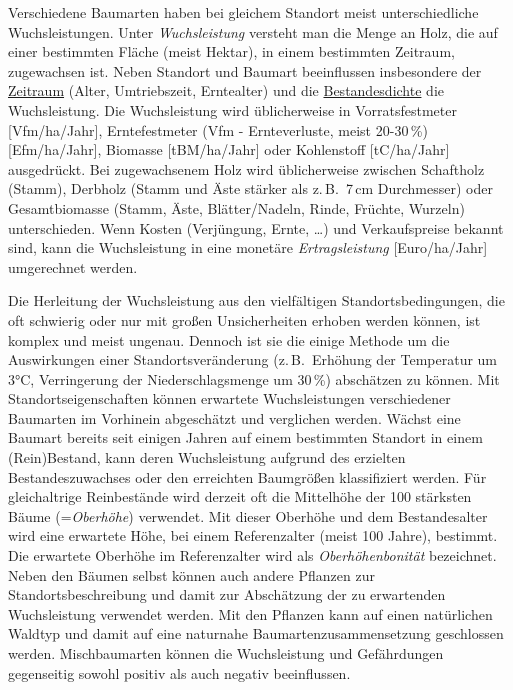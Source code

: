 \documentclass[twocolumn]{scrartcl}
\begin{document}
Verschiedene Baumarten haben bei gleichem Standort meist unterschiedliche
Wuchsleistungen. Unter \emph{Wuchsleistung} versteht man
die Menge an Holz, die auf einer bestimmten Fläche (meist Hektar), in einem
bestimmten Zeitraum, zugewachsen ist. Neben Standort und Baumart beeinflussen
insbesondere der \hyperref[sec:AlterUndErntezeitpunkt]{Zeitraum} (Alter,
Umtriebszeit, Erntealter) und die
\hyperref[sec:StammzahlUndBestandesdichte]{Bestandesdichte} die Wuchsleistung.
Die Wuchsleistung wird üblicherweise in Vorratsfestmeter [Vfm/ha/Jahr],
Erntefestmeter (Vfm - Ernteverluste, meist 20-30\,\%) [Efm/ha/Jahr], Biomasse
[tBM/ha/Jahr] oder Kohlenstoff [tC/ha/Jahr] ausgedrückt. Bei zugewachsenem Holz
wird üblicherweise zwischen Schaftholz (Stamm), Derbholz (Stamm und Äste stärker
als z.\,B.\ 7\,cm Durchmesser) oder Gesamtbiomasse (Stamm, Äste, Blätter/Nadeln,
Rinde, Früchte, Wurzeln) unterschieden. Wenn Kosten (Verjüngung, Ernte, \dots)
und Verkaufspreise bekannt sind, kann die Wuchsleistung in eine monetäre
\emph{Ertragsleistung} [Euro/ha/Jahr] umgerechnet werden.

Die Herleitung der Wuchsleistung aus den vielfältigen Standortsbedingungen, die
oft schwierig oder nur mit großen Unsicherheiten erhoben werden können, ist
komplex und meist ungenau. Dennoch ist sie die einige Methode um die
Auswirkungen einer Standortsveränderung (z.\,B.\ Erhöhung der Temperatur um 3°C,
Verringerung der Niederschlagsmenge um 30\,\%) abschätzen zu können. Mit
Standortseigenschaften können erwartete Wuchsleistungen verschiedener Baumarten
im Vorhinein abgeschätzt und verglichen werden. Wächst eine Baumart bereits seit
einigen Jahren auf einem bestimmten Standort in einem (Rein)Bestand, kann deren
Wuchsleistung aufgrund des erzielten Bestandeszuwachses oder den erreichten
Baumgrößen klassifiziert werden. Für gleichaltrige Reinbestände wird derzeit oft
die Mittelhöhe der 100 stärksten Bäume (=\emph{Oberhöhe})
verwendet. Mit dieser Oberhöhe und dem Bestandesalter wird eine erwartete Höhe,
bei einem Referenzalter (meist 100 Jahre), bestimmt. Die erwartete Oberhöhe im
Referenzalter wird als \emph{Oberhöhenbonität}
bezeichnet. Neben den Bäumen selbst können auch andere Pflanzen zur
Standortsbeschreibung und damit zur Abschätzung der zu erwartenden Wuchsleistung
verwendet werden. Mit den Pflanzen kann auf einen natürlichen Waldtyp und damit
auf eine naturnahe Baumartenzusammensetzung geschlossen werden. Mischbaumarten
können die Wuchsleistung und Gefährdungen gegenseitig sowohl positiv als auch
negativ beeinflussen.
\end{document}
